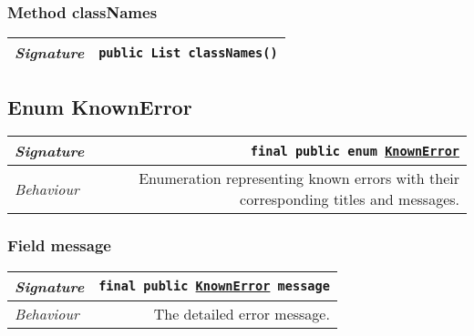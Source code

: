 \begin{adjustwidth}{1.5em}{0pt}
\begin{adjustwidth}{1.5em}{0pt}
\begin{adjustwidth}{1.5em}{0pt}
{\begin{tabularx}{1.0\linewidth}{@{}l R@{}}
      \end{tabularx}}
    \end{adjustwidth}\subsubsection{Method classNames\label{edu.kit.hci.soli.dto.CalendarEvent@classNames()}}
    \begin{adjustwidth}{1.5em}{0pt}
      {\begin{tabularx}{1.0\linewidth}{@{}l R@{}}
        \emph{Signature} & \texttt{public \texttt{List} classNames()} \\
        \hline
  
      \end{tabularx}}
    \end{adjustwidth}
  \end{adjustwidth}\subsection{Enum KnownError\label{edu.kit.hci.soli.dto.KnownError} }
  \begin{adjustwidth}{1.5em}{0pt}
    {\begin{tabularx}{1.0\linewidth}{@{}l R@{}}
      \emph{Signature} & \texttt{final public  enum \texttt{\hyperref[edu.kit.hci.soli.dto.KnownError]{\texttt{KnownError}}}} \\
      \hline
      \emph{Behaviour} & Enumeration representing known errors with their corresponding titles and messages.  \\
      \hline
  
    \end{tabularx}}\subsubsection{Field message\label{edu.kit.hci.soli.dto.KnownError@message}}
    \begin{adjustwidth}{1.5em}{0pt}
      {\begin{tabularx}{1.0\linewidth}{@{}l R@{}}
        \emph{Signature} & \texttt{final public \texttt{\hyperref[edu.kit.hci.soli.dto.KnownError]{\texttt{KnownError}}} message} \\
        \hline
        \emph{Behaviour} & The detailed error message.  \\
        \hline
  

\end{tabularx}}
\end{adjustwidth}
\end{adjustwidth}
\end{adjustwidth}
